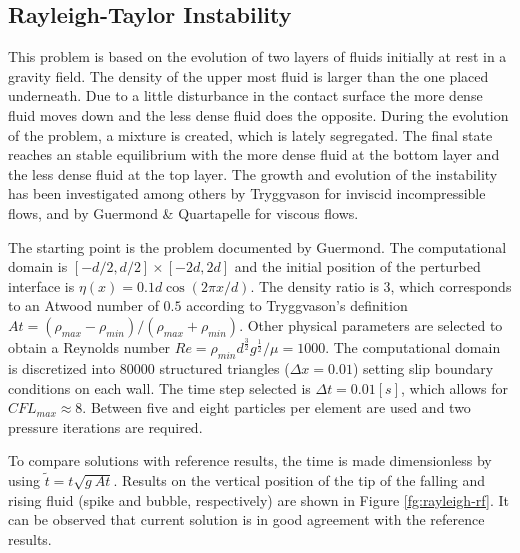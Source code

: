 \subsection{Rayleigh-Taylor Instability}

This problem is based on the evolution of two layers of fluids initially at rest in a gravity field. The density of the upper most fluid is larger than the one placed underneath. Due to a little disturbance in the contact surface the more dense fluid moves down and the less dense fluid does the opposite. During the evolution of the problem, a mixture is created, which is lately segregated. The final state reaches an stable equilibrium with the more dense fluid at the bottom layer and the less dense fluid at the top layer. The growth and evolution of the instability has been investigated among others by Tryggvason\cite{Tryggvason88} for inviscid incompressible flows, and by Guermond \& Quartapelle\cite{Guermond00} for viscous flows.

The starting point is the problem documented by Guermond\cite{Guermond00}. The computational domain is $[-d/2,d/2]\times[-2d,2d]$ and the initial position of the perturbed interface is $\eta(x) = 0.1d \cos(2\pi x/d)$. The density ratio is $3$, which corresponds to an Atwood
number of $0.5$ according to Tryggvason's definition $At = (\rho_{max}-\rho_{min})/(\rho_{max}+\rho_{min})$. Other physical parameters are selected to obtain a Reynolds number $Re=\rho_{min}d^{\frac{3}{2}}g^{\frac{1}{2}}/\mu=1000$. The computational domain is discretized into $80000$ structured triangles ($\Delta x=0.01$) setting slip boundary conditions on each wall. The time step selected is $\Delta t=0.01[s]$, which allows for $CFL_{max} \approx 8$. Between five and eight particles per element are used and two pressure iterations are required.

To compare solutions with reference results, the time is made dimensionless by using $\widetilde{t} = t\sqrt{g\ At}$. Results on the vertical position of the tip of the falling and rising fluid (spike and bubble, respectively) are shown in Figure \ref{fg:rayleigh-rf}. It can be observed that current solution is in good agreement with the reference results.

